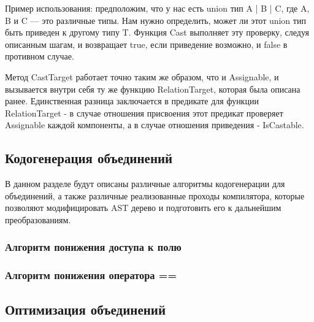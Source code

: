 Пример использования:
предположим, что у нас есть union тип A | B | C, где A, B и C — это различные типы.
Нам нужно определить, может ли этот union тип быть приведен к другому типу T.
Функция Cast выполняет эту проверку, следуя описанным шагам, и возвращает true, если приведение возможно, и
false в противном случае.

Метод CastTarget работает точно таким же образом, что и Assignable, и вызывается внутри себя ту же функцию RelationTarget,
которая была описана ранее.
Единственная разница заключается в предикате для функции RelationTarget - в случае отношения присвоения этот предикат
проверяет Assignable каждой компоненты, а в случае отношения приведения - IsCastable.

\subsection{Кодогенерация объединений}

В данном разделе будут описаны различные алгоритмы кодогенерации для объединений, а также различные реализованные
проходы компилятора, которые позволяют модифицировать AST дерево и подготовить его к дальнейшим преобразованиям.

\subsubsection{Алгоритм понижения доступа к полю}

\subsubsection{Алгоритм понижения оператора ==}

\subsection{Оптимизация объединений}


\newpage

